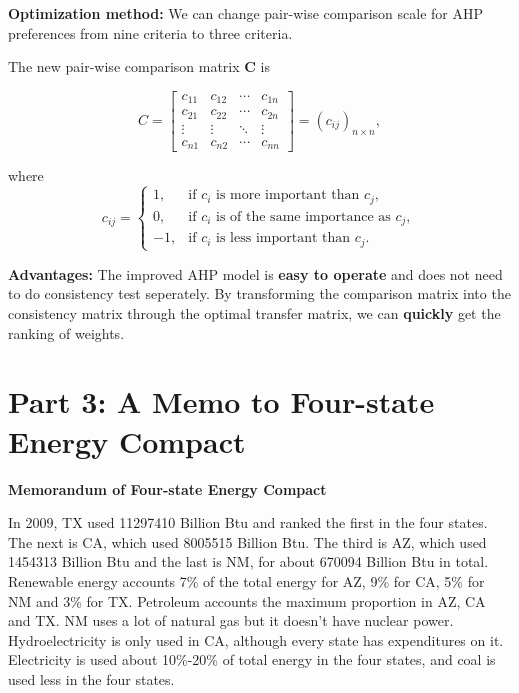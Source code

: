 \documentclass{mcmthesis}
\begin{document}
{\bf{Optimization method:}} We can change pair-wise comparison scale for AHP preferences from nine criteria to three criteria. 

The new pair-wise comparison matrix {\bf{C}} is

\begin{equation}\label{28}
 {C}=
\left[ \begin{array}{cccc}
   c_{11} & c_{12} & \cdots & c_{1n} \\
   c_{21} & c_{22} & \cdots & c_{2n} \\
   \vdots & \vdots & \ddots & \vdots \\
   c_{n1} & c_{n2} & \cdots & c_{nn} 
  \end{array}
  \right]
  =\left(c_{ij}\right)_{n\times n},
\end{equation}

where
\begin{equation}\label{29}
c_{ij}= \left\{
\begin{array}{rl}
1, & \text{if } c_i \text{ is more important than } c_j,\\
0, & \text{if } c_i \text{ is of the same importance as } c_j,\\
-1, & \text{if }c_i \text{ is less important than } c_j.
\end{array} \right.
\end{equation}

{\bf{Advantages:}} The improved AHP model is {\bf{easy to operate}} and does not need to do consistency test seperately. By transforming the comparison matrix into the consistency matrix through the optimal transfer matrix, we can {\bf{quickly}} get the ranking of weights.

\newpage

\section{Part 3: A Memo to Four-state Energy Compact}

\centerline{\bf{\large{Memorandum of Four-state Energy Compact}}}

In 2009, TX used 11297410 Billion Btu and ranked the first in the four states. The next is CA, which used 8005515 Billion Btu. The third is AZ, which used 1454313 Billion Btu and the last is NM, for about 670094 Billion Btu in total. Renewable energy accounts 7\% of the total energy for AZ, 9\% for CA, 5\% for NM and 3\% for TX. Petroleum accounts the maximum proportion in AZ, CA and TX. NM uses a lot of natural gas but it doesn't have nuclear power. Hydroelectricity is only used in CA, although every state has expenditures on it. Electricity is used about 10\%-20\% of total energy in the four states, and coal is used less in the four states.
\end{document}
